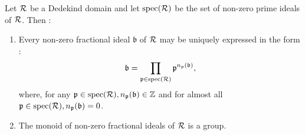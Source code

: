 \begin{theorem}
  Let $\mathcal{R}$ be a Dedekind domain and let $\operatorname{spec}(\mathcal{R})$ be the set of non-zero prime ideals of $\mathcal{R}$. Then :
  \begin{enumerate}
    \item Every non-zero fractional ideal $\mathfrak{b}$ of $\mathcal{R}$ may be uniquely expressed in the form :
    \[\mathfrak{b} = \prod_{\mathfrak{p}\in \operatorname{spec}(\mathcal{R})} {\mathfrak{p}}^{n_p(\mathfrak{b})},\]
    where, for any $\mathfrak{p}\in \operatorname{spec}(\mathcal{R}),n_{\mathfrak{p}}(\mathfrak{b})\in \mathbb{Z}$ and for almost all $\mathfrak{p}\in \operatorname{spec}(\mathcal{R}), n_{\mathfrak{p}}(\mathfrak{b}) = 0$.
    \item The monoid of non-zero fractional ideals of $\mathcal{R}$ is a group.
  \end{enumerate}
\end{theorem}

